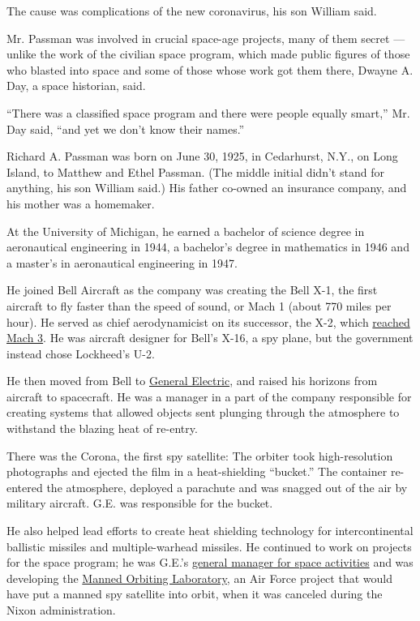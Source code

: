 The cause was complications of the new coronavirus, his son William
said.

Mr. Passman was involved in crucial space-age projects, many of them
secret --- unlike the work of the civilian space program, which made
public figures of those who blasted into space and some of those whose
work got them there, Dwayne A. Day, a space historian, said.

``There was a classified space program and there were people equally
smart,'' Mr. Day said, ``and yet we don't know their names.''

Richard A. Passman was born on June 30, 1925, in Cedarhurst, N.Y., on
Long Island, to Matthew and Ethel Passman. (The middle initial didn't
stand for anything, his son William said.) His father co-owned an
insurance company, and his mother was a homemaker.

At the University of Michigan, he earned a bachelor of science degree in
aeronautical engineering in 1944, a bachelor's degree in mathematics in
1946 and a master's in aeronautical engineering in 1947.

He joined Bell Aircraft as the company was creating the Bell X-1, the
first aircraft to fly faster than the speed of sound, or Mach 1 (about
770 miles per hour). He served as chief aerodynamicist on its successor,
the X-2, which
\href{https://www.nasa.gov/centers/armstrong/news/FactSheets/FS-079-DFRC.html}{reached
Mach 3}. He was aircraft designer for Bell's X-16, a spy plane, but the
government instead chose Lockheed's U-2.

He then moved from Bell to
\href{https://minutemanmissile.com/documents/GEReentryVehicles.pdf}{General
Electric}, and raised his horizons from aircraft to spacecraft. He was a
manager in a part of the company responsible for creating systems that
allowed objects sent plunging through the atmosphere to withstand the
blazing heat of re-entry.

There was the Corona, the first spy satellite: The orbiter took
high-resolution photographs and ejected the film in a heat-shielding
``bucket.'' The container re-entered the atmosphere, deployed a
parachute and was snagged out of the air by military aircraft. G.E. was
responsible for the bucket.

He also helped lead efforts to create heat shielding technology for
intercontinental ballistic missiles and multiple-warhead missiles. He
continued to work on projects for the space program; he was G.E.'s
\href{https://aero.engin.umich.edu/wp-content/uploads/sites/2/2017/06/riding-the-crest-a-history-of-michigan2019s-aerospace-engineering-department.pdf}{general
manager for space activities} and was developing the
\href{https://www.nasa.gov/feature/50-years-ago-nasa-benefits-from-mol-cancellation}{Manned
Orbiting Laboratory}, an Air Force project that would have put a manned
spy satellite into orbit, when it was canceled during the Nixon
administration.

